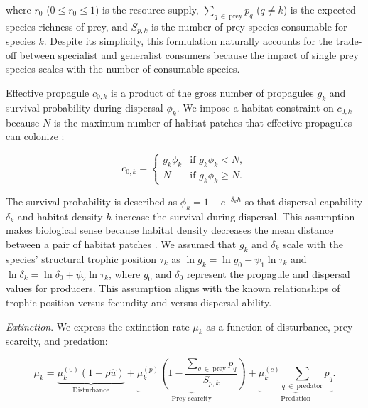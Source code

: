 \documentclass[11pt, class=article, crop=false]{standalone}
\begin{document}
where $r_0$ ($0 \le r_0 \le 1$) is the resource supply, $\sum_{q~\in~\text{prey}} p_{q}$ ($q \ne k$) is the expected species richness of prey, and $S_{p,k}$ is the number of prey species consumable for species $k$.
Despite its simplicity, this formulation naturally accounts for the trade-off between specialist and generalist consumers because the impact of single prey species scales with the number of consumable species.

Effective propagule $c_{0,k}$ is a product of the gross number of propagules $g_k$ and survival probability during dispersal $\phi_k$.
We impose a habitat constraint on $c_{0,k}$ because $N$ is the maximum number of habitat patches that effective propagules can colonize \citep{takimoto_effects_2012, terui_spatial_2019}:

\begin{equation}
    c_{0, k} = 
    \begin{cases}
        g_k \phi_k & \text{if $g_k \phi_k < N$},\\
        N & \text{if $g_k \phi_k \ge N$}.
    \end{cases}
    \label{eq:c0-prod}
\end{equation}

The survival probability is described as $\phi_k = 1 - e^{-\delta_k h}$ so that dispersal capability $\delta_k$ and habitat density $h$ increase the survival during dispersal.
This assumption makes biological sense because habitat density decreases the mean distance between a pair of habitat patches \citep{terui_spatial_2019}.
We assumed that $g_k$ and $\delta_k$ scale with the species' structural trophic position $\tau_k$ as $\ln g_k = \ln g_0 - \psi_1 \ln \tau_k$ and $\ln \delta_k = \ln \delta_0 + \psi_2 \ln \tau_k$, where $g_0$ and $\delta_0$ represent the propagule and dispersal values for producers.
This assumption aligns with the known relationships of trophic position versus fecundity and versus dispersal ability.

\textit{Extinction}. We express the extinction rate $\mu_k$ as a function of disturbance, prey scarcity, and predation:

\begin{equation}
    \mu_{k} = 
        \underbrace{\mu_{k}^{(0)} (1 + \rho \hat{u})}_{\text{Disturbance}} + 
        \underbrace{\mu_{k}^{(p)} \left(1 - \frac{\sum_{q~\in~\text{prey}} p_{q}}{S_{p, k}} \right)}_{\text{Prey scarcity}} + 
        \underbrace{\mu_{k}^{(c)} \sum_{q~\in~\text{predator}} p_{q}}_{\text{Predation}}.
    \label{eq:extn}    
\end{equation}
\end{document}
